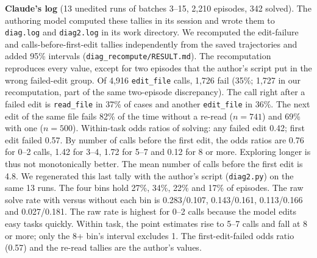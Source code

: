 \textbf{Claude's log} (13 unedited runs of batches 3--15, 2,210 episodes, 342 solved). The authoring model computed these tallies in its session and wrote them to \texttt{diag.log} and \texttt{diag2.log} in its work directory. We recomputed the edit-failure and calls-before-first-edit tallies independently from the saved trajectories and added 95\% intervals (\texttt{diag\_recompute/RESULT.md}). The recomputation reproduces every value, except for two episodes that the author's script put in the wrong failed-edit group. Of 4,916 \texttt{edit\_file} calls, 1,726 fail (35\%; 1,727 in our recomputation, part of the same two-episode discrepancy). The call right after a failed edit is \texttt{read\_file} in 37\% of cases and another \texttt{edit\_file} in 36\%. The next edit of the same file fails 82\% of the time without a re-read ($n = 741$) and 69\% with one ($n = 500$). Within-task odds ratios of solving: any failed edit 0.42; first edit failed 0.57. By number of calls before the first edit, the odds ratios are 0.76 for 0--2 calls, 1.42 for 3--4, 1.72 for 5--7 and 0.12 for 8 or more. Exploring longer is thus not monotonically better. The mean number of calls before the first edit is 4.8. We regenerated this last tally with the author's script (\texttt{diag2.py}) on the same 13 runs. The four bins hold 27\%, 34\%, 22\% and 17\% of episodes. The raw solve rate with versus without each bin is 0.283/0.107, 0.143/0.161, 0.113/0.166 and 0.027/0.181. The raw rate is highest for 0--2 calls because the model edits easy tasks quickly. Within task, the point estimates rise to 5--7 calls and fall at 8 or more; only the 8+ bin's interval excludes 1. The first-edit-failed odds ratio (0.57) and the re-read tallies are the author's values.
